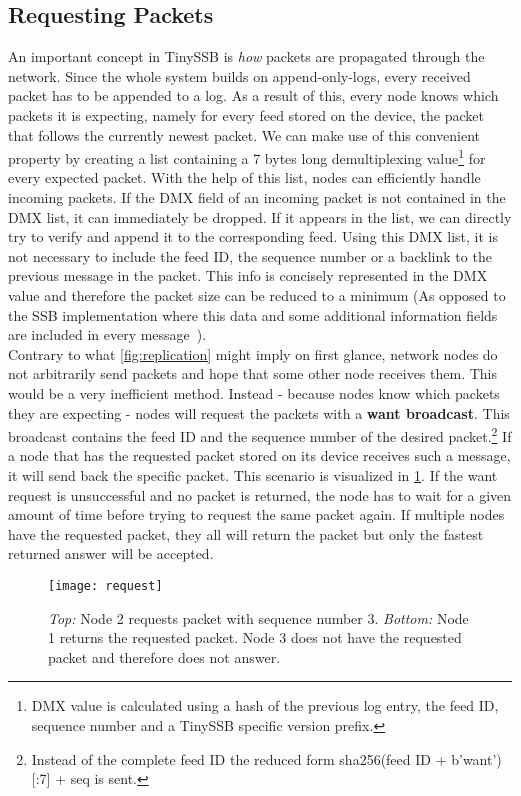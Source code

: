 \subsection{Requesting Packets}
An important concept in TinySSB is \textit{how} packets are propagated through the network. Since the whole system builds on append-only-logs, every received packet has to be appended to a log. As a result of this, every node knows which packets it is expecting, namely for every feed stored on the device, the packet that follows the currently newest packet. We can make use of this convenient property by creating a list containing a 7 bytes long demultiplexing value\footnote{DMX value is calculated using a hash of the previous log entry, the feed ID, sequence number and a TinySSB specific version prefix.} for every expected packet. With the help of this list, nodes can efficiently handle incoming packets. If the DMX field of an incoming packet is not contained in the DMX list, it can immediately be dropped. If it appears in the list, we can directly try to verify and append it to the corresponding feed. Using this DMX list, it is not necessary to include the feed ID, the sequence number or a backlink to the previous message in the packet. This info is concisely represented in the DMX value and therefore the packet size can be reduced to a minimum (As opposed to the SSB implementation where this data and some additional information fields are included in every message~\cite{10.1145/3357150.3357396}). \\
Contrary to what \cref{fig:replication} might imply on first glance, network nodes do not arbitrarily send packets and hope that some other node receives them. This would be a very inefficient method. Instead - because nodes know which packets they are expecting - nodes will request the packets with a \textbf{want broadcast}. This broadcast contains the feed ID and the sequence number of the desired packet.\footnote{Instead of the complete feed ID the reduced form sha256(feed ID + b'want')[:7] + seq is sent.} If a node that has the requested packet stored on its device receives such a message, it will send back the specific packet. This scenario is visualized in \cref{fig:request}. If the want request is unsuccessful and no packet is returned, the node has to wait for a given amount of time before trying to request the same packet again. If multiple nodes have the requested packet, they all will return the packet but only the fastest returned answer will be accepted.

\begin{figure}
\centering
\texttt{[image: request]}
\caption{\textit{Top:} Node 2 requests packet with sequence number 3. \textit{Bottom:} Node 1 returns the requested packet. Node 3 does not have the requested packet and therefore does not answer.}
\label{fig:request}
\end{figure}

